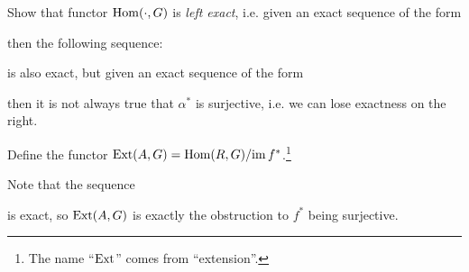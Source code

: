 \begin{exercise}
  Show that functor
  $\operatorname{Hom}(\cdot, G)$ is \emph{left exact},
  i.e. given an exact sequence of the form
  \begin{center}
  \end{center}
  then the following sequence:
  \begin{center}
  \end{center}
  is also exact, but given an exact sequence of
  the form
  \begin{center}
  \end{center}
  then it is not always true that $\alpha^*$ is
  surjective, i.e. we can lose exactness on the
  right.
\end{exercise}

\begin{definition}
  Define the functor
  $\operatorname{Ext}(A, G) = \operatorname{Hom}(R, G) / {\operatorname{im} f^*}$.\footnote{The name ``$\operatorname{Ext}$'' comes from ``extension''.}
\end{definition}

\begin{remark}
  Note that the sequence
  \begin{center}
  \end{center}
  is exact, so $\operatorname{Ext}(A, G)$ is exactly the
  obstruction to $f^*$ being surjective.
\end{remark}

